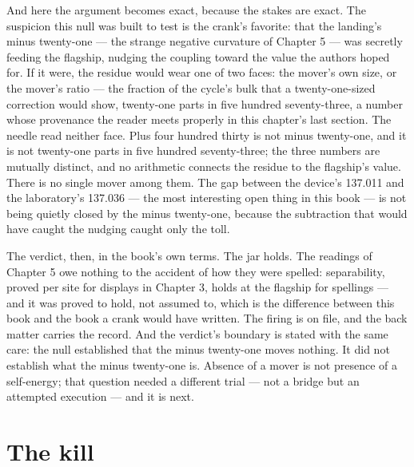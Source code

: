 And here the argument becomes exact, because the stakes are exact. The suspicion
this null was built to test is the crank's favorite: that the landing's minus
twenty-one --- the strange negative curvature of Chapter 5 --- was secretly
feeding the flagship, nudging the coupling toward the value the authors hoped
for. If it were, the residue would wear one of two faces: the mover's own size,
or the mover's ratio --- the fraction of the cycle's bulk that a twenty-one-sized
correction would show, twenty-one parts in five hundred seventy-three, a number
whose provenance the reader meets properly in this chapter's last section. The
needle read neither face. Plus four hundred thirty is not minus twenty-one, and
it is not twenty-one parts in five hundred seventy-three; the three numbers are
mutually distinct, and no arithmetic connects the residue to the flagship's
value. There is no single mover among them. The gap between the device's
137.011 and the laboratory's 137.036 --- the most interesting open thing in this
book --- is not being quietly closed by the minus twenty-one, because the
subtraction that would have caught the nudging caught only the toll.

The verdict, then, in the book's own terms. The jar holds. The readings of
Chapter 5 owe nothing to the accident of how they were spelled: separability,
proved per site for displays in Chapter 3, holds at the flagship for spellings
--- and it was proved to hold, not assumed to, which is the difference between
this book and the book a crank would have written. The firing is on file, and
the back matter carries the record. And the verdict's boundary is stated with the same care: the null
established that the minus twenty-one moves nothing. It did not establish what
the minus twenty-one is. Absence of a mover is not presence of a self-energy;
that question needed a different trial --- not a bridge but an attempted
execution --- and it is next.

\section{The kill}

